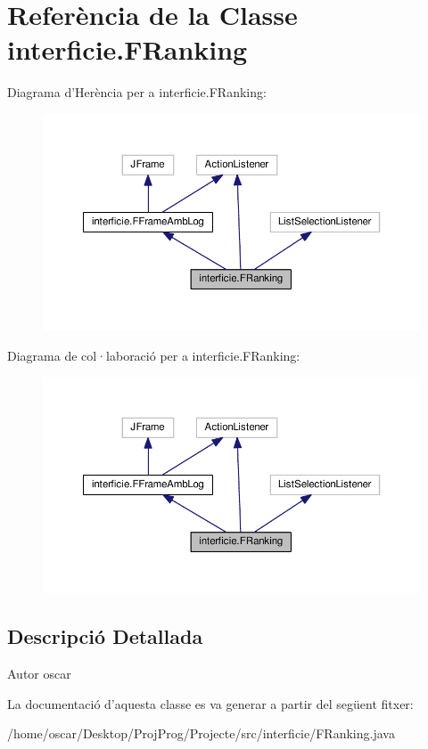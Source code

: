 \hypertarget{classinterficie_1_1_f_ranking}{\section{Referència de la Classe interficie.\+F\+Ranking}
\label{classinterficie_1_1_f_ranking}
}


Diagrama d'Herència per a interficie.\+F\+Ranking\+:\nopagebreak
\begin{figure}[H]
\begin{center}
\leavevmode
\includegraphics[width=350pt]{classinterficie_1_1_f_ranking__inherit__graph}
\end{center}
\end{figure}


Diagrama de col·laboració per a interficie.\+F\+Ranking\+:\nopagebreak
\begin{figure}[H]
\begin{center}
\leavevmode
\includegraphics[width=350pt]{classinterficie_1_1_f_ranking__coll__graph}
\end{center}
\end{figure}


\subsection{Descripció Detallada}
\begin{DoxyAuthor}{Autor}
oscar 
\end{DoxyAuthor}


La documentació d'aquesta classe es va generar a partir del següent fitxer\+:\begin{DoxyCompactItemize}
\item 
/home/oscar/\+Desktop/\+Proj\+Prog/\+Projecte/src/interficie/F\+Ranking.\+java\end{DoxyCompactItemize}
